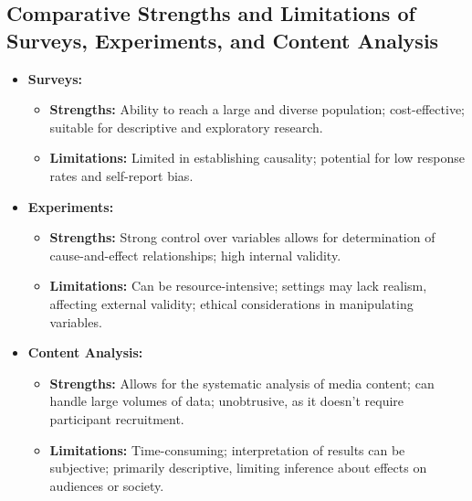 \documentclass[
]{book}
\providecommand{\tightlist}{%
  \setlength{\itemsep}{0pt}\setlength{\parskip}{0pt}}
\begin{document}
\hypertarget{comparative-strengths-and-limitations-of-surveys-experiments-and-content-analysis}{%
\subsection*{Comparative Strengths and Limitations of Surveys, Experiments, and Content Analysis}\label{comparative-strengths-and-limitations-of-surveys-experiments-and-content-analysis}}

\begin{itemize}
\tightlist
\item
  \textbf{Surveys:}

  \begin{itemize}
  \tightlist
  \item
    \textbf{Strengths:} Ability to reach a large and diverse population; cost-effective; suitable for descriptive and exploratory research.
  \item
    \textbf{Limitations:} Limited in establishing causality; potential for low response rates and self-report bias.
  \end{itemize}
\item
  \textbf{Experiments:}

  \begin{itemize}
  \tightlist
  \item
    \textbf{Strengths:} Strong control over variables allows for determination of cause-and-effect relationships; high internal validity.
  \item
    \textbf{Limitations:} Can be resource-intensive; settings may lack realism, affecting external validity; ethical considerations in manipulating variables.
  \end{itemize}
\item
  \textbf{Content Analysis:}

  \begin{itemize}
  \tightlist
  \item
    \textbf{Strengths:} Allows for the systematic analysis of media content; can handle large volumes of data; unobtrusive, as it doesn't require participant recruitment.
  \item
    \textbf{Limitations:} Time-consuming; interpretation of results can be subjective; primarily descriptive, limiting inference about effects on audiences or society.
  \end{itemize}
\end{itemize}
\end{document}
